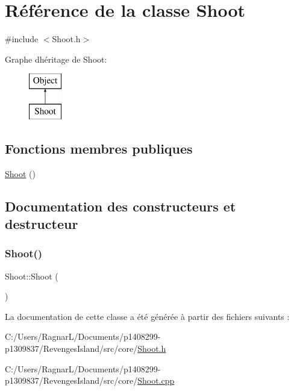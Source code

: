 \hypertarget{class_shoot}{}\section{Référence de la classe Shoot}
\label{class_shoot}


{\ttfamily \#include $<$Shoot.\+h$>$}

Graphe d\textquotesingle{}héritage de Shoot\+:\begin{figure}[H]
\begin{center}
\leavevmode
\includegraphics[height=2.000000cm]{class_shoot}
\end{center}
\end{figure}
\subsection*{Fonctions membres publiques}
\begin{DoxyCompactItemize}
\item 
\hyperlink{class_shoot_a13490e5d90536aecbceb753e11879a5b}{Shoot} ()
\end{DoxyCompactItemize}


\subsection{Documentation des constructeurs et destructeur}
\mbox{\label{class_shoot_a13490e5d90536aecbceb753e11879a5b}} 
\subsubsection{\texorpdfstring{Shoot()}{Shoot()}}
{\footnotesize\ttfamily Shoot\+::\+Shoot (\begin{DoxyParamCaption}{ }\end{DoxyParamCaption})}



La documentation de cette classe a été générée à partir des fichiers suivants \+:\begin{DoxyCompactItemize}
\item 
C\+:/\+Users/\+Ragnar\+L/\+Documents/p1408299-\/p1309837/\+Revenges\+Island/src/core/\hyperlink{_shoot_8h}{Shoot.\+h}\item 
C\+:/\+Users/\+Ragnar\+L/\+Documents/p1408299-\/p1309837/\+Revenges\+Island/src/core/\hyperlink{_shoot_8cpp}{Shoot.\+cpp}\end{DoxyCompactItemize}
